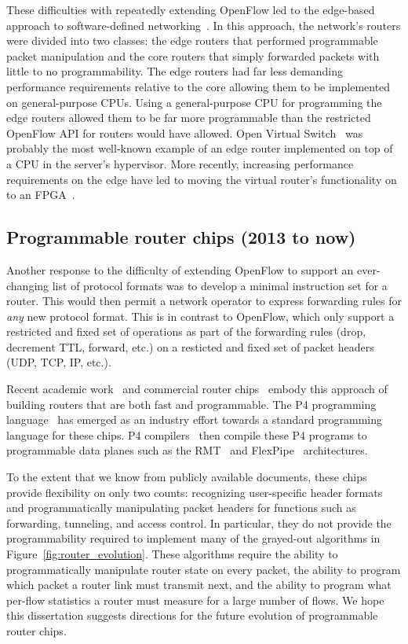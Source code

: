 These difficulties with repeatedly extending OpenFlow led to the edge-based
approach to software-defined networking~\cite{fabric, nsx, openvswitch}. In
this approach, the network's routers were divided into two classes: the edge
routers that performed programmable packet manipulation and the core routers
that simply forwarded packets with little to no programmability. The edge
routers had far less demanding performance requirements relative to the core
allowing them to be implemented on general-purpose CPUs. Using a
general-purpose CPU for programming the edge routers allowed them to be far
more programmable than the restricted OpenFlow API for routers would have
allowed. Open Virtual Switch~\cite{ovs} was probably the most well-known
example of an edge router implemented on top of a CPU in the server's
hypervisor. More recently, increasing performance requirements on the edge have
led to moving the virtual router's functionality on to an
FPGA~\cite{daniel_firestone_nsdi}. 


\subsection{Programmable router chips (2013 to now)}
\label{ss:prog_router_chips}
Another response to the difficulty of extending OpenFlow to support an
ever-changing list of protocol formats was to develop a minimal instruction set
for a router. This would then permit a network operator to express forwarding
rules for {\em any} new protocol format. This is in contrast to OpenFlow, which
only support a restricted and fixed set of operations as part of the forwarding
rules (drop, decrement TTL, forward, etc.) on a resticted and fixed set of
packet headers (UDP, TCP, IP, etc.).

Recent academic work~\cite{rmt} and commercial router chips~\cite{tofino,
flexpipe, xpliant} embody this approach of building routers that are both fast
and programmable. The P4 programming language~\cite{p4} has emerged as an
industry effort towards a standard programming language for these chips.  P4
compilers~\cite{lavanya_compiler, p4c} then compile these P4 programs to
programmable data planes such as the RMT~\cite{rmt} and
FlexPipe~\cite{flexpipe} architectures.

To the extent that we know from publicly available documents, these chips
provide flexibility on only two counts: recognizing user-specific header
formats and programmatically manipulating packet headers for functions such as
forwarding, tunneling, and access control. In particular, they do not provide
the programmability required to implement many of the grayed-out algorithms in
Figure~\ref{fig:router_evolution}.  These algorithms require the ability to
programmatically manipulate router state on every packet, the ability to
program which packet a router link must transmit next, and the ability to
program what per-flow statistics a router must measure for a large number of
flows. We hope this dissertation suggests directions for the future evolution
of programmable router chips.

